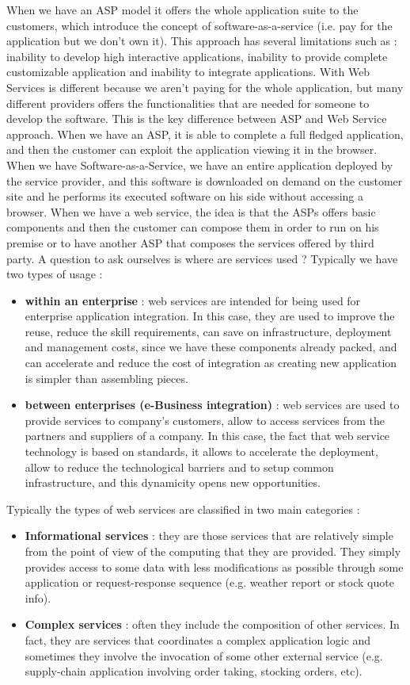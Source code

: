 \documentclass[11pt]{article}
\begin{document}
When we have an ASP model it offers the whole application suite to the customers, which introduce the concept of software-as-a-service (i.e. pay for the application but we don't own it). This approach has several limitations such as : inability to develop high interactive applications, inability to provide complete customizable application and inability to integrate applications. With Web Services is different because we aren't paying for the whole application, but many different providers offers the functionalities that are needed for someone to develop the software. This is the key difference between ASP and Web Service approach. When we have an ASP, it is able to complete a full fledged application, and then the customer can exploit the application viewing it in the browser. When we have Software-as-a-Service, we have an entire application deployed by the service provider, and this software is downloaded on demand on the customer site and he performs its executed software on his side without accessing a browser. When we have a web service, the idea is that the ASPs offers basic components and then the customer can compose them in order to run on his premise or to have another ASP that composes the services offered by third party. A question to ask ourselves is where are services used ? Typically we have two types of usage :
\begin{itemize}
\item \textbf{within an enterprise} : web services are intended for being used for enterprise application integration. In this case, they are used to improve the reuse, reduce the skill requirements, can save on infrastructure, deployment and management costs, since we have these components already packed, and can accelerate and reduce the cost of integration as creating new application is simpler than assembling pieces.
\item \textbf{between enterprises (e-Business integration)} : web services are used to provide services to company's customers, allow to access services from the partners and suppliers of a company. In this case, the fact that web service technology is based on standards, it allows to accelerate the deployment, allow to reduce the technological barriers and to setup common infrastructure, and this dynamicity opens new opportunities.
\end{itemize}
Typically the types of web services are classified in two main categories :
\begin{itemize}
\item \textbf{Informational services} : they are those services that are relatively simple from the point of view of the computing that they are provided. They simply provides access to some data with less modifications as possible through some application or request-response sequence (e.g. weather report or stock quote info).
\item \textbf{Complex services} : often they include the composition of other services. In fact, they are services that coordinates a complex application logic and sometimes they involve the invocation of some other external service (e.g. supply-chain application involving order taking, stocking orders, etc).
\end{itemize}
\end{document}
